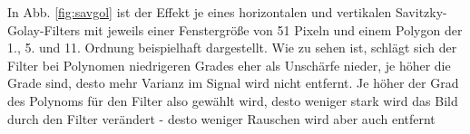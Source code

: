 \documentclass[
  12pt,
  openany]{book}
\begin{document}
In Abb. \ref{fig:savgol} ist der Effekt je eines horizontalen und vertikalen Savitzky-Golay-Filters mit jeweils einer Fenstergröße von 51 Pixeln und einem Polygon der 1., 5. und 11. Ordnung beispielhaft dargestellt. Wie zu sehen ist, schlägt sich der Filter bei Polynomen niedrigeren Grades eher als Unschärfe nieder, je höher die Grade sind, desto mehr Varianz im Signal wird nicht entfernt. Je höher der Grad des Polynoms für den Filter also gewählt wird, desto weniger stark wird das Bild durch den Filter verändert - desto weniger Rauschen wird aber auch entfernt
\end{document}
